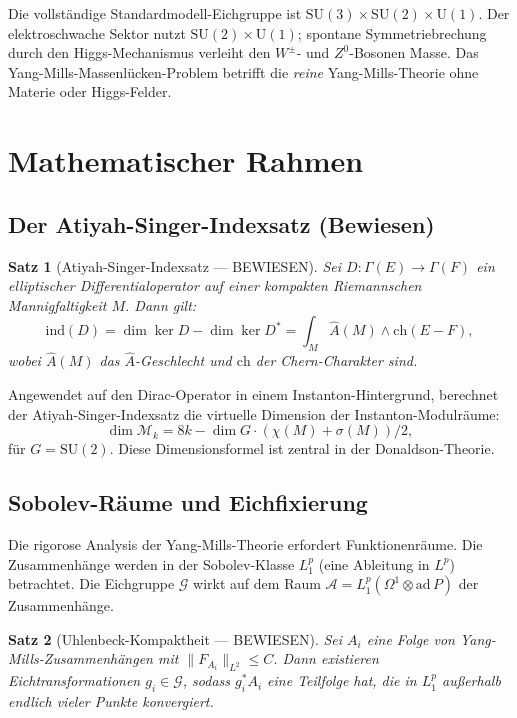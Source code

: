 \documentclass[12pt,a4paper]{amsart}
\newtheorem{theorem}{Satz}[section]
\theoremstyle{definition}
\theoremstyle{remark}
\begin{document}
Die vollständige Standardmodell-Eichgruppe ist
$\mathrm{SU}(3) \times \mathrm{SU}(2) \times \mathrm{U}(1)$.
Der elektroschwache Sektor nutzt $\mathrm{SU}(2) \times \mathrm{U}(1)$; spontane
Symmetriebrechung durch den Higgs-Mechanismus verleiht den $W^\pm$- und $Z^0$-Bosonen
Masse. Das Yang-Mills-Massenlücken-Problem betrifft die \emph{reine} Yang-Mills-Theorie
ohne Materie oder Higgs-Felder.

\section{Mathematischer Rahmen}
\label{sec:rahmen}

\subsection{Der Atiyah-Singer-Indexsatz (Bewiesen)}

\begin{theorem}[Atiyah-Singer-Indexsatz — BEWIESEN]
\label{satz:atiyah-singer}
Sei $D: \Gamma(E) \to \Gamma(F)$ ein elliptischer Differentialoperator auf einer
kompakten Riemannschen Mannigfaltigkeit $M$. Dann gilt:
\[
  \mathrm{ind}(D) = \dim \ker D - \dim \ker D^* = \int_M \hat{A}(M) \wedge \mathrm{ch}(E - F),
\]
wobei $\hat{A}(M)$ das $\hat{A}$-Geschlecht und $\mathrm{ch}$ der Chern-Charakter sind.
\end{theorem}

Angewendet auf den Dirac-Operator in einem Instanton-Hintergrund, berechnet der
Atiyah-Singer-Indexsatz die virtuelle Dimension der Instanton-Modulräume:
\[
  \dim \mathcal{M}_k = 8k - \dim G \cdot (\chi(M) + \sigma(M))/2,
\]
für $G = \mathrm{SU}(2)$. Diese Dimensionsformel ist zentral in der Donaldson-Theorie.

\subsection{Sobolev-Räume und Eichfixierung}

Die rigorose Analysis der Yang-Mills-Theorie erfordert Funktionenräume. Die Zusammenhänge
werden in der Sobolev-Klasse $L^p_1$ (eine Ableitung in $L^p$) betrachtet. Die Eichgruppe
$\mathcal{G}$ wirkt auf dem Raum $\mathcal{A} = L^p_1(\Omega^1 \otimes \mathrm{ad}\, P)$
der Zusammenhänge.

\begin{theorem}[Uhlenbeck-Kompaktheit — BEWIESEN]
\label{satz:uhlenbeck}
Sei $A_i$ eine Folge von Yang-Mills-Zusammenhängen mit $\|F_{A_i}\|_{L^2} \leq C$.
Dann existieren Eichtransformationen $g_i \in \mathcal{G}$, sodass $g_i^* A_i$ eine
Teilfolge hat, die in $L^p_1$ außerhalb endlich vieler Punkte konvergiert.
\end{theorem}
\end{document}
